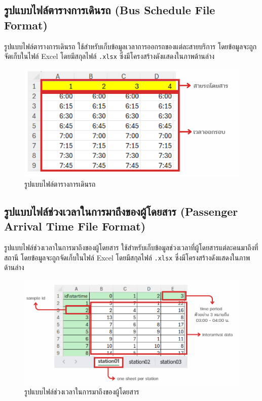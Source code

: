 \subsection{รูปแบบไฟล์ตารางการเดินรถ (Bus Schedule File Format)}
\begin{mypara}
    \indent รูปแบบไฟล์ตารางการเดินรถ ใช้สำหรับเก็บข้อมูลเวลาการออกรถของแต่ละสายบริการ 
    โดยข้อมูลจะถูกจัดเก็บในไฟล์ Excel โดยมีสกุลไฟล์ \texttt{.xlsx} 
    ซึ่งมีโครงสร้างดังแสดงในภาพด้านล่าง
    \begin{figure}[H]
      \centering
      \includegraphics[scale=0.5]{bus_schedule.png}
      \caption{รูปแบบไฟล์ตารางการเดินรถ}
      \label{fig:BusScheduleFileFormat}
    \end{figure}
\end{mypara}

\subsection{รูปแบบไฟล์ช่วงเวลาในการมาถึงของผู้โดยสาร (Passenger Arrival Time File Format)}
\begin{mypara}
    \indent รูปแบบไฟล์ช่วงเวลาในการมาถึงของผู้โดยสาร ใช้สำหรับเก็บข้อมูลช่วงเวลาที่ผู้โดยสารแต่ละคนมาถึงที่สถานี
    โดยข้อมูลจะถูกจัดเก็บในไฟล์ Excel โดยมีสกุลไฟล์ \texttt{.xlsx} 
    ซึ่งมีโครงสร้างดังแสดงในภาพด้านล่าง
    \begin{figure}[H]
      \centering
      \includegraphics[scale=0.5]{Passenger_Interarrival.png}
      \caption{รูปแบบไฟล์ช่วงเวลาในการมาถึงของผู้โดยสาร}
      \label{fig:PassengerArrivalFileFormat}
    \end{figure}
\end{mypara}
